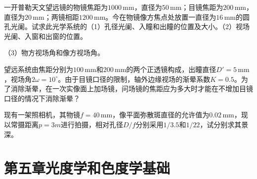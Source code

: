 \documentclass[standard, analysis, notocnum]{ExBook}
\newcommand{\answerarea}[1][8cm]{%
  \par\vspace{2mm}%
  \noindent{\color{themeColor!35}\rule{\linewidth}{0.4pt}}\par
  \noindent\begin{minipage}[t][#1][t]{\linewidth}\vspace{0pt}\end{minipage}\par
  \noindent{\color{themeColor!35}\rule{\linewidth}{0.4pt}}\par
}
\begin{document}
\begin{qitems}[startnum=7]
\qitem 一开普勒天文望远镜的物镜焦距为$1000\,\mathrm{mm}$，直径为$50\,\mathrm{mm}$；目镜焦距为$200\,\mathrm{mm}$，直径为$20\,\mathrm{mm}$；两镜相距$1200\,\mathrm{mm}$。今在物镜像方焦点处放置一直径为$16\,\mathrm{mm}$的圆孔光阑。试求此光学系统的（1）孔径光阑、入瞳和出瞳的位置及大小。（2）视场光阑、入窗和出窗的位置。
\par\noindent （3）物方视场角和像方视场角。
\label{q:87:start}
\answerarea[8cm]
\label{q:87:end}
\end{qitems}

\begin{qitems}[startnum=8]
\qitem 望远系统由焦距分别为$100\,\mathrm{mm}$和$200\,\mathrm{mm}$的两个正透镜构成，出瞳直径$D'=5\,\mathrm{mm}$，视场角$2\omega =10^{\circ}$。由于目镜口径的限制，轴外边缘视场的渐晕系数$K=0.5$。为了消除渐晕，在一次实像面上加场镜，问场镜的焦距应为多大时才能在不增加目镜口径的情况下消除渐晕？
\label{q:88:start}
\answerarea[8cm]
\label{q:88:end}
\end{qitems}

\begin{qitems}[startnum=9]
\qitem 现有一架照相机，其物镜$f=40\,\mathrm{mm}$，像平面弥散斑直径的允许值为$0.02\,\mathrm{mm}$，现以常摄距离$p=3m$进行拍摄，相对孔径$D/f$分别采用$1/3.5$和$1/22$，试分别求其景深。
\label{q:89:start}
\answerarea[8cm]
\label{q:89:end}
\end{qitems}

\section{第五章\quad 光度学和色度学基础}
\end{document}
